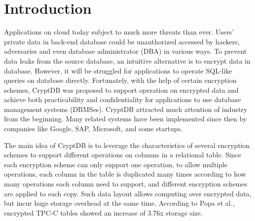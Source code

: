 \section{Introduction}

Applications on cloud today subject to much more threats than ever. Users' private data in back-end database could be unauthorized accessed by hackers, adversaries and even database administrator (DBA) in various ways. To prevent data leaks from the source database, an intuitive alternative is to encrypt data in database. However, it will be struggled for applications to operate SQL-like queries on database directly. Fortunately, with the help of certain encryption schemes, CryptDB \citep{popa2011cryptdb} was proposed to support operation on encrypted data and achieve both practicability and confidentiality for applications to use database management systems (DBMSes). CryptDB attracted much attention of industry from the beginning. Many related systems have been implemented since then by companies like Google, SAP, Microsoft, and some startups\citep{cryptdbsite, kerschbaum2013encrypted}.


The main idea of CryptDB is to leverage the characteristics of several encryption schemes to support different operations on columns in a relational table.  Since each encryption scheme can only support one operation, to allow multiple operations, each column in the table is duplicated many times according to how many operations each column need to support, and different encryption schemes are applied to each copy. Such data layout allows computing over encrypted data, but incur huge storage overhead at the same time. According to Popa et al.\citep{popa2011cryptdb}, encrypted TPC-C tables showed an increase of 3.76x storage size.


